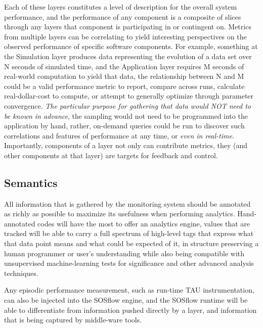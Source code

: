 Each of these layers constitutes a level of description for the
overall system performance, and the performance of any component is a
composite of slices through any layers that component is participating
in or contingent on. Metrics from multiple layers can be correlating
to yield interesting perspectives on the observed performance of
specific software components.  For example, something at the
Simulation layer produces data representing the evolution of a data
set over N seconds of simulated time, and the Application layer
requires M seconds of real-world computation to yield that data, the
relationship between N and M could be a valid performance metric to
report, compare across runs, calculate real-dollar-cost to compute, or
attempt to generally optimize through parameter convergence. \textit{The
particular purpose for gathering that data would NOT need to be known
in advance}, the sampling would not need to be programmed into the
application by hand, rather, on-demand queries could be run to
discover such correlations and features of performance at any time, or
\textit{even in real-time}. Importantly, components of a layer not
only can contribute metrics, they (and other components at that layer)
are targets for feedback and control.


\subsection{Semantics}
All information that is gathered by the monitoring system should be
annotated as richly as possible to maximize its usefulness when
performing analytics.  Hand-annotated codes will have the most to
offer an analytics engine, values that are tracked will be able to
carry a full spectrum of high-level tags that express what that data
point means and what could be expected of it, in structure preserving
a human programmer or user's understanding while also being compatible
with unsupervised machine-learning tests for significance and other
advanced analysis techniques.

Any episodic performance measurement, such as run-time TAU
instrumentation, can also be injected into the SOSflow engine, and the
SOSflow runtime will be able to differentiate from information pushed
directly by a layer, and information that is being captured by
middle-ware tools.


